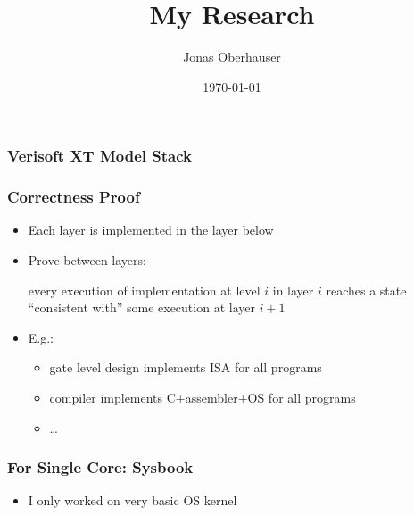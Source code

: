 \documentclass{beamer}
\title{My Research}
\author{Jonas Oberhauser}
\date{\today} %
\begin{document}
\begin{frame}
\titlepage %
\end{frame}

\begin{frame}
\frametitle{Verisoft XT Model Stack}
\begin{center}
 \end{center}
\end{frame}

\begin{frame}
\frametitle{Correctness Proof}
\begin{itemize}
	\item Each layer is implemented in the layer below
	\item Prove between layers:
	\begin{center}
		every execution of implementation at level $i$ in layer $i$ reaches a state 
		``consistent with'' some execution at layer $i+1$
	\end{center}
	\item E.g.: 
	\begin{itemize}
		\item gate level design implements ISA for all programs
		\item compiler implements C+assembler+OS for all programs
		\item \ldots
	\end{itemize}
\end{itemize}
\end{frame}

\begin{frame}
\frametitle{For Single Core: Sysbook}
\begin{itemize}
	\item<2-> I only worked on very basic OS kernel
\end{itemize}
\end{frame}
\end{document}
